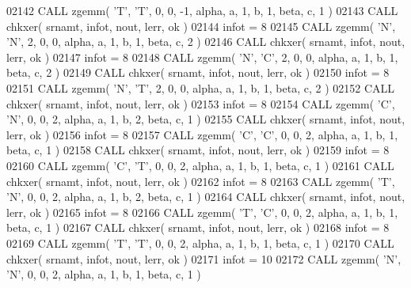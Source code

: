 \begin{DoxyCode}
02142       \textcolor{keyword}{CALL }zgemm( \textcolor{stringliteral}{'T'}, \textcolor{stringliteral}{'T'}, 0, 0, -1, alpha, a, 1, b, 1, beta, c, 1 )
02143       \textcolor{keyword}{CALL }chkxer( srnamt, infot, nout, lerr, ok )
02144       infot = 8
02145       \textcolor{keyword}{CALL }zgemm( \textcolor{stringliteral}{'N'}, \textcolor{stringliteral}{'N'}, 2, 0, 0, alpha, a, 1, b, 1, beta, c, 2 )
02146       \textcolor{keyword}{CALL }chkxer( srnamt, infot, nout, lerr, ok )
02147       infot = 8
02148       \textcolor{keyword}{CALL }zgemm( \textcolor{stringliteral}{'N'}, \textcolor{stringliteral}{'C'}, 2, 0, 0, alpha, a, 1, b, 1, beta, c, 2 )
02149       \textcolor{keyword}{CALL }chkxer( srnamt, infot, nout, lerr, ok )
02150       infot = 8
02151       \textcolor{keyword}{CALL }zgemm( \textcolor{stringliteral}{'N'}, \textcolor{stringliteral}{'T'}, 2, 0, 0, alpha, a, 1, b, 1, beta, c, 2 )
02152       \textcolor{keyword}{CALL }chkxer( srnamt, infot, nout, lerr, ok )
02153       infot = 8
02154       \textcolor{keyword}{CALL }zgemm( \textcolor{stringliteral}{'C'}, \textcolor{stringliteral}{'N'}, 0, 0, 2, alpha, a, 1, b, 2, beta, c, 1 )
02155       \textcolor{keyword}{CALL }chkxer( srnamt, infot, nout, lerr, ok )
02156       infot = 8
02157       \textcolor{keyword}{CALL }zgemm( \textcolor{stringliteral}{'C'}, \textcolor{stringliteral}{'C'}, 0, 0, 2, alpha, a, 1, b, 1, beta, c, 1 )
02158       \textcolor{keyword}{CALL }chkxer( srnamt, infot, nout, lerr, ok )
02159       infot = 8
02160       \textcolor{keyword}{CALL }zgemm( \textcolor{stringliteral}{'C'}, \textcolor{stringliteral}{'T'}, 0, 0, 2, alpha, a, 1, b, 1, beta, c, 1 )
02161       \textcolor{keyword}{CALL }chkxer( srnamt, infot, nout, lerr, ok )
02162       infot = 8
02163       \textcolor{keyword}{CALL }zgemm( \textcolor{stringliteral}{'T'}, \textcolor{stringliteral}{'N'}, 0, 0, 2, alpha, a, 1, b, 2, beta, c, 1 )
02164       \textcolor{keyword}{CALL }chkxer( srnamt, infot, nout, lerr, ok )
02165       infot = 8
02166       \textcolor{keyword}{CALL }zgemm( \textcolor{stringliteral}{'T'}, \textcolor{stringliteral}{'C'}, 0, 0, 2, alpha, a, 1, b, 1, beta, c, 1 )
02167       \textcolor{keyword}{CALL }chkxer( srnamt, infot, nout, lerr, ok )
02168       infot = 8
02169       \textcolor{keyword}{CALL }zgemm( \textcolor{stringliteral}{'T'}, \textcolor{stringliteral}{'T'}, 0, 0, 2, alpha, a, 1, b, 1, beta, c, 1 )
02170       \textcolor{keyword}{CALL }chkxer( srnamt, infot, nout, lerr, ok )
02171       infot = 10
02172       \textcolor{keyword}{CALL }zgemm( \textcolor{stringliteral}{'N'}, \textcolor{stringliteral}{'N'}, 0, 0, 2, alpha, a, 1, b, 1, beta, c, 1 )

\end{DoxyCode}
